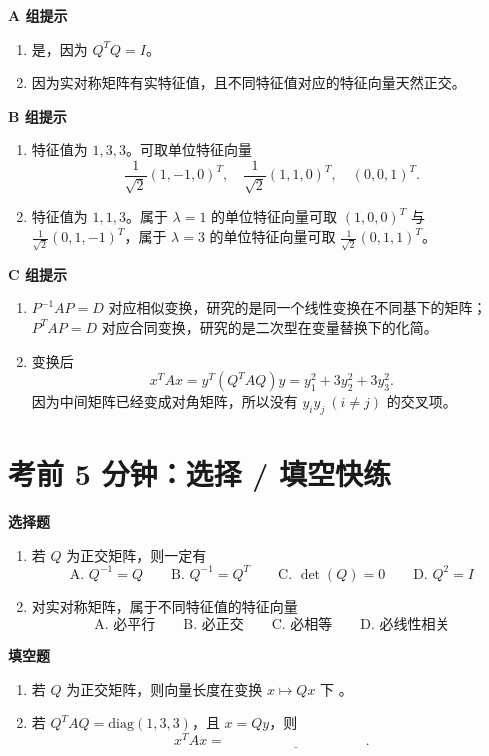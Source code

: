 \documentclass[11pt,oneside,UTF8]{ctexbook}
\begin{document}
\begin{summarybox}[答案提示]
\textbf{A 组提示}
\begin{enumerate}[label=\textbf{A\arabic*.}]
  \item 是，因为 \(Q^TQ=I\)。
  \item 因为实对称矩阵有实特征值，且不同特征值对应的特征向量天然正交。
\end{enumerate}

\textbf{B 组提示}
\begin{enumerate}[label=\textbf{B\arabic*.}]
  \item 特征值为 \(1,3,3\)。可取单位特征向量
  \[
  \frac{1}{\sqrt2}(1,-1,0)^T,\quad
  \frac{1}{\sqrt2}(1,1,0)^T,\quad
  (0,0,1)^T.
  \]
  \item 特征值为 \(1,1,3\)。属于 \(\lambda=1\) 的单位特征向量可取 \((1,0,0)^T\) 与 \(\frac1{\sqrt2}(0,1,-1)^T\)，属于 \(\lambda=3\) 的单位特征向量可取 \(\frac1{\sqrt2}(0,1,1)^T\)。
\end{enumerate}

\textbf{C 组提示}
\begin{enumerate}[label=\textbf{C\arabic*.}]
  \item \(P^{-1}AP=D\) 对应相似变换，研究的是同一个线性变换在不同基下的矩阵；\(P^TAP=D\) 对应合同变换，研究的是二次型在变量替换下的化简。
  \item 变换后
  \[
  x^TAx=y^T(Q^TAQ)y=y_1^2+3y_2^2+3y_3^2.
  \]
  因为中间矩阵已经变成对角矩阵，所以没有 \(y_iy_j\ (i\neq j)\) 的交叉项。
\end{enumerate}
\end{summarybox}

\section{考前 5 分钟：选择 / 填空快练}

\begin{exercisebox}[第 4 章选择与填空快练]
\textbf{选择题}
\begin{enumerate}[label=\textbf{选\arabic*.}]
  \item 若 \(Q\) 为正交矩阵，则一定有
  \[
  \text{A. }Q^{-1}=Q\qquad
  \text{B. }Q^{-1}=Q^T\qquad
  \text{C. }\det(Q)=0\qquad
  \text{D. }Q^2=I
  \]
  \item 对实对称矩阵，属于不同特征值的特征向量
  \[
  \text{A. 必平行}\qquad
  \text{B. 必正交}\qquad
  \text{C. 必相等}\qquad
  \text{D. 必线性相关}
  \]
\end{enumerate}

\textbf{填空题}
\begin{enumerate}[label=\textbf{填\arabic*.}]
  \item 若 \(Q\) 为正交矩阵，则向量长度在变换 \(x\mapsto Qx\) 下 \underline{\hspace{3em}}。
  \item 若 \(Q^TAQ=\mathrm{diag}(1,3,3)\)，且 \(x=Qy\)，则
  \[
  x^TAx=\underline{\hspace{10em}}.
  \]
\end{enumerate}
\end{exercisebox}
\end{document}

